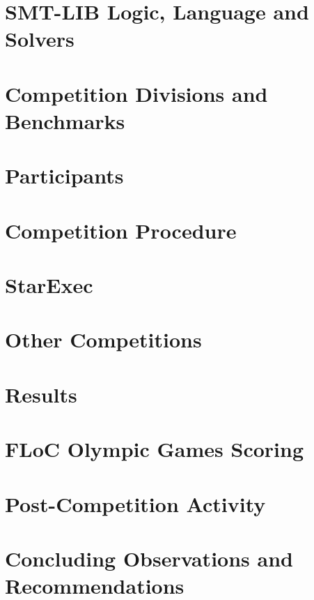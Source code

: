 \documentclass[twoside,11pt]{article}
\begin{document}
\section{SMT-LIB Logic, Language and Solvers}
\label{sec:context}

\section{Competition Divisions and Benchmarks}
\label{sec:benchmarks}

\section{Participants}
\label{sec:participants}

\section{Competition Procedure}
\label{sec:procedure}

\section{StarExec}
\label{sec:starexec}

\section{Other Competitions}
\label{sec:OtherCompetitions}

\section{Results}
\label{sec:results}

\section{FLoC Olympic Games Scoring}
\label{sec:floc}

\section{Post-Competition Activity}
\label{sec:post}

\section{Concluding Observations and Recommendations}
\label{sec:conclusions}


%
\end{document}
